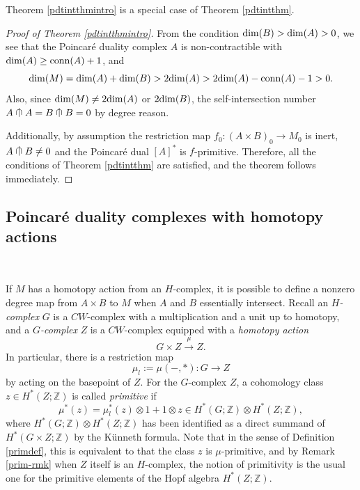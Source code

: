 \documentclass[a4]{amsart}
\theoremstyle{definition}
\newcommand{\testcap}{\mathrel{\vcenter{\offinterlineskip
\hbox{$\cap$}\vskip-1.8ex\hbox{$\kern0.2em | \kern0.15em$}}}}
\begin{document}
\begin{sloppypar}
Theorem \ref{pdtintthmintro} is a special case of Theorem \ref{pdtintthm}. 

\begin{proof}[Proof of Theorem \ref{pdtintthmintro}]
From the condition ${\rm dim}(B)>{\rm dim}(A)>0$, we see that the Poincar\'{e} duality complex $A$ is non-contractible with ${\rm dim}(A)\geq {\rm conn}(A)+1$, and 
\[
{\rm dim}(M)={\rm dim}(A)+{\rm dim}(B)>2{\rm dim}(A)>2{\rm dim}(A)-{\rm conn}(A)-1>0.
\] 
Also, since ${\rm dim}(M)\neq 2{\rm dim}(A)$ or $2{\rm dim}(B)$, the self-intersection number $A\testcap A=B\testcap B=0$ by degree reason. 

Additionally, by assumption the restriction map $f_0: (A\times B)_0\longrightarrow M_0$ is inert, $A\testcap B\neq 0$ and the Poincar\'{e} dual $[A]^\ast$ is $f$-primitive. Therefore, all the conditions of Theorem \ref{pdtintthm} are satisfied, and the theorem follows immediately. 
\end{proof}
\subsection{Poincar\'{e} duality complexes with homotopy actions}
\label{subsec: GPoin}

$\, $

If $M$ has a homotopy action from an $H$-complex, it is possible to define a nonzero degree map from $A\times B$ to $M$ when $A$ and $B$ essentially intersect. Recall an {\it $H$-complex} $G$ is a $CW$-complex with a multiplication and a unit up to homotopy, and a {\it $G$-complex} $Z$ is a $CW$-complex equipped with a {\it homotopy action} 
\[G\times Z\stackrel{\mu}{\longrightarrow} Z.\] In particular, there is a restriction map 
\begin{equation}\label{muleq}
\mu_l:=\mu(-,\ast): G\stackrel{}{\longrightarrow} Z
\end{equation}
by acting on the basepoint of $Z$. For the $G$-complex $Z$, a cohomology class $z\in H^\ast(Z;\mathbb{Z})$ is called {\it primitive} if 
\[
\mu^\ast(z)=  \mu_l^\ast(z)\otimes 1+1\otimes z\in H^\ast(G;\mathbb{Z})\otimes H^\ast(Z;\mathbb{Z}),
\]
where $H^\ast(G;\mathbb{Z})\otimes H^\ast(Z;\mathbb{Z})$ has been identified as a direct summand of $H^\ast(G\times Z;\mathbb{Z})$ by the K\"{u}nneth formula. Note that in the sense of Definition \ref{primdef}, this is equivalent to that the class $z$ is $\mu$-primitive, and by Remark \ref{prim-rmk} when $Z$ itself is an $H$-complex, the notion of primitivity is the usual one for the primitive elements of the Hopf algebra $H^\ast(Z;\mathbb{Z})$. 


\end{sloppypar}
\end{document}
